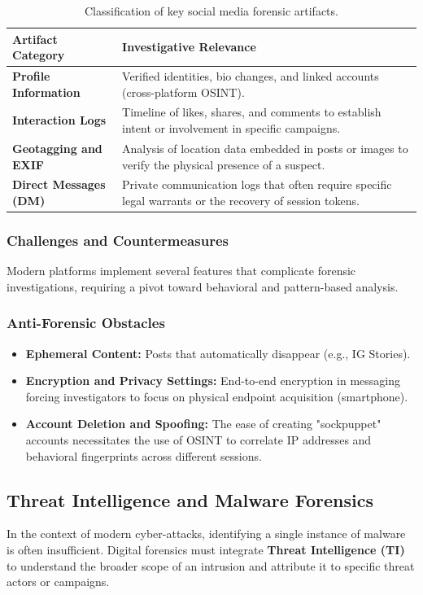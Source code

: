 \begin{table}[H]
\centering
\small
\begin{tabular}{|p{3.5cm}|p{8cm}|}
\hline
\textbf{Artifact Category} & \textbf{Investigative Relevance} \\
\hline
\textbf{Profile Information} & Verified identities, bio changes, and linked accounts (cross-platform OSINT). \\
\hline
\textbf{Interaction Logs} & Timeline of likes, shares, and comments to establish intent or involvement in specific campaigns. \\
\hline
\textbf{Geotagging and EXIF} & Analysis of location data embedded in posts or images to verify the physical presence of a suspect. \\
\hline
\textbf{Direct Messages (DM)} & Private communication logs that often require specific legal warrants or the recovery of session tokens. \\
\hline
\end{tabular}
\caption{Classification of key social media forensic artifacts.}
\end{table}

\subsubsection{Challenges and Countermeasures}
Modern platforms implement several features that complicate forensic investigations, requiring a pivot toward behavioral and pattern-based analysis.

\subsubsection*{Anti-Forensic Obstacles}
\begin{itemize}
    \item \textbf{Ephemeral Content:} Posts that automatically disappear (e.g., IG Stories). 
    \item \textbf{Encryption and Privacy Settings:} End-to-end encryption in messaging forcing investigators to focus on physical endpoint acquisition (smartphone).
    \item \textbf{Account Deletion and Spoofing:} The ease of creating "sockpuppet" accounts necessitates the use of OSINT to correlate IP addresses and behavioral fingerprints across different sessions.
\end{itemize}

\noindent


\subsection{Threat Intelligence and Malware Forensics}
In the context of modern cyber-attacks, identifying a single instance of malware is often insufficient. Digital forensics must integrate \textbf{Threat Intelligence (TI)} to understand the broader scope of an intrusion and attribute it to specific threat actors or campaigns.

